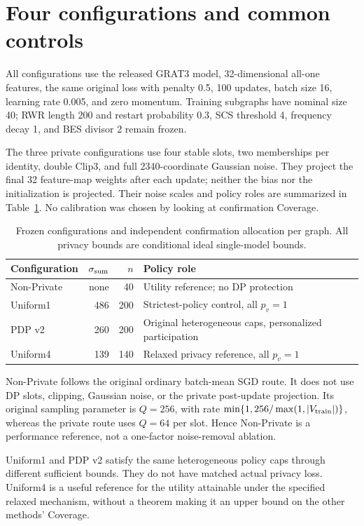 \section{Four configurations and common controls}
All configurations use the released GRAT3 model, 32-dimensional all-one features, the same original loss with penalty 0.5, 100 updates, batch size 16, learning rate 0.005, and zero momentum. Training subgraphs have nominal size 40; RWR length 200 and restart probability 0.3, SCS threshold 4, frequency decay 1, and BES divisor 2 remain frozen.

The three private configurations use four stable slots, two memberships per identity, double Clip3, and full 2340-coordinate Gaussian noise. They project the final 32 feature-map weights after each update; neither the bias nor the initialization is projected. Their noise scales and policy roles are summarized in Table~\ref{tab:config}. No calibration was chosen by looking at confirmation Coverage.

\begin{table}[htbp]
\centering\small
\caption{Frozen configurations and independent confirmation allocation per graph. All privacy bounds are conditional ideal single-model bounds.}\label{tab:config}
\begin{tabular}{lrrp{64mm}}\toprule
Configuration & $\sigma_{\rm sum}$ & $n$ & Policy role\\\midrule
Non-Private & none & 40 & Utility reference; no DP protection\\
Uniform1 & 486 & 200 & Strictest-policy control, all $p_v=1$\\
PDP v2 & 260 & 200 & Original heterogeneous caps, personalized participation\\
Uniform4 & 139 & 140 & Relaxed privacy reference, all $p_v=1$\\\bottomrule
\end{tabular}
\end{table}

Non-Private follows the original ordinary batch-mean SGD route. It does not use DP slots, clipping, Gaussian noise, or the private post-update projection. Its original sampling parameter is $Q=256$, with rate $\min\{1,256/\max(1,|V_{\rm train}|)\}$, whereas the private route uses $Q=64$ per slot. Hence Non-Private is a performance reference, not a one-factor noise-removal ablation.

Uniform1 and PDP v2 satisfy the same heterogeneous policy caps through different sufficient bounds. They do not have matched actual privacy loss. Uniform4 is a useful reference for the utility attainable under the specified relaxed mechanism, without a theorem making it an upper bound on the other methods' Coverage.

